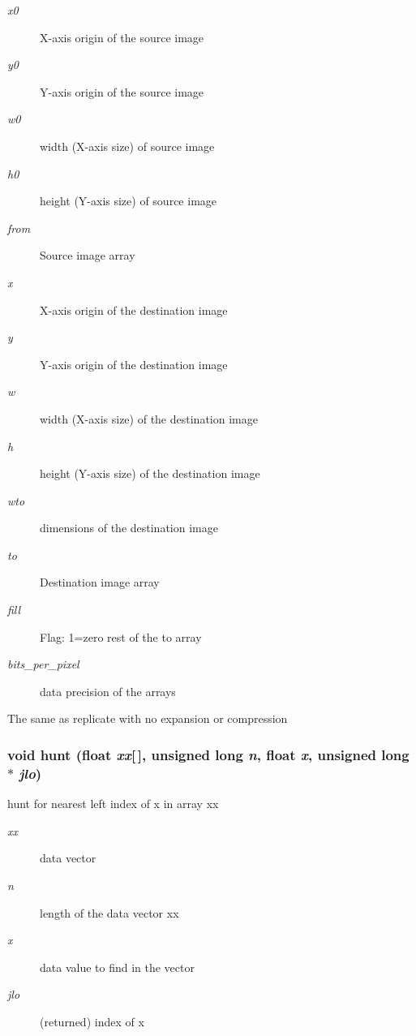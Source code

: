\begin{Desc}
\item[Parameters:]
\begin{description}
\item[{\em x0}]X-axis origin of the source image \item[{\em y0}]Y-axis origin of the source image \item[{\em w0}]width (X-axis size) of source image \item[{\em h0}]height (Y-axis size) of source image \item[{\em from}]Source image array \item[{\em x}]X-axis origin of the destination image \item[{\em y}]Y-axis origin of the destination image \item[{\em w}]width (X-axis size) of the destination image \item[{\em h}]height (Y-axis size) of the destination image \item[{\em wto}]dimensions of the destination image \item[{\em to}]Destination image array \item[{\em fill}]Flag: 1=zero rest of the to array \item[{\em bits\_\-per\_\-pixel}]data precision of the arrays\end{description}
\end{Desc}
The same as replicate with no expansion or compression 
\subsubsection{\setlength{\rightskip}{0pt plus 5cm}void hunt (float {\em xx}[$\,$], unsigned long {\em n}, float {\em x}, unsigned long $\ast$ {\em jlo})}\label{xtvutils_8c_a230}


hunt for nearest left index of x in array xx 

\begin{Desc}
\item[Parameters:]
\begin{description}
\item[{\em xx}]data vector \item[{\em n}]length of the data vector xx \item[{\em x}]data value to find in the vector \item[{\em jlo}](returned) index of x \end{description}
\end{Desc}
